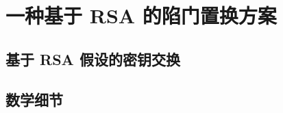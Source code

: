 \section{一种基于 RSA 的陷门置换方案}\label{sec:10-3}

\subsection{基于 RSA 假设的密钥交换}\label{subsec:10-3-1}

\subsection{数学细节}\label{subsec:10-3-2}